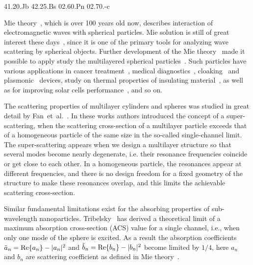 \documentclass[aps,prl,twocolumn,showpacs,superscriptaddress,groupedaddress]{revtex4-1}
\begin{document}
\pacs%
{41.20.Jb 42.25.Bs 02.60.Pn 02.70.-c}

\maketitle %

Mie theory~\cite{Mie-1908}, which is over 100 years old now, describes
interaction of electromagnetic waves with spherical particles. Mie
solution is still of great interest these
days~\cite{Suzuki-2008,MacKowski-2012,Lerme-2000,Xu-2005,Li-2006,Gogoi-2010,Santiago-2011},
since it is one of the primary tools for analyzing wave scattering by
spherical objects. Further development of the Mie
theory~\cite{Yang-2003, Pena-scattnlay-2009} made it possible to apply
study the multilayered spherical
particles~\cite{Sheehan-2013,Selmke-2012}.  Such particles have
various applications in cancer treatment~\cite{Zhang-2010,
  Hirsch-2003}, medical diagnostics~\cite{Allain-2002},
cloaking~\cite{Qui-2009, Semouchkina-2013, Ladutenko-2014} and
plasmonic~\cite{Martin-2013, Alu-2005} devices, study on thermal
properties of insulating material~\cite{Xie-2013}, as well as for
improving solar cells performance~\cite{Kameya-2011,Mann-2011}, and so
on.

The scattering properties of multilayer cylinders and spheres was
studied in great detail by Fan~et~al.~\cite{Fan-2010,Fan-2011}.  In these
works authors introduced the concept of a super-scattering, when the
scattering cross-section of a multilayer particle exceeds that of a
homogeneous particle of the same size in the so-called single-channel
limit. The super-scattering appears when we design a multilayer
structure so that several modes become nearly degenerate, i.e. their
resonance frequencies coincide or get close to each other. In a
homogeneous particle, the resonances appear at different frequencies,
and there is no design freedom for a fixed geometry of the structure
to make these resonances overlap, and this limits the achievable
scattering cross-section.

Similar fundamental limitations exist for the absorbing properties of
sub-wavelength nanoparticles.  Tribelsky~\cite{Tribelsky-2011} has derived a
theoretical limit of a maximum absorption cross-section (ACS) value
for a single channel, i.e., when only one mode of the sphere is
excited.  As a result the absorption coefficients $\tilde{a}_n= {\rm
  Re}\{a_n\} - |a_n|^2 $ and $\tilde{b}_n= {\rm Re}\{b_n\} - |b_n|^2 $
become limited by $1/4$, here $a_n$ and $b_n$ are scattering
coefficient as defined in Mie theory~\cite{Bohren-1983}.
\end{document}
